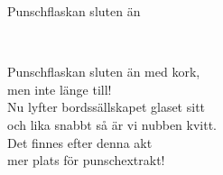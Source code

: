 \begin{song}{Punschflaskan sluten än}

	\\
	
	Punschflaskan sluten än med kork,\\
	men inte länge till!\\
	Nu lyfter bordssällskapet glaset sitt\\
	och lika snabbt så är vi nubben kvitt.\\
	Det finnes efter denna akt\\
	mer plats för punschextrakt!
	
\end{song}
